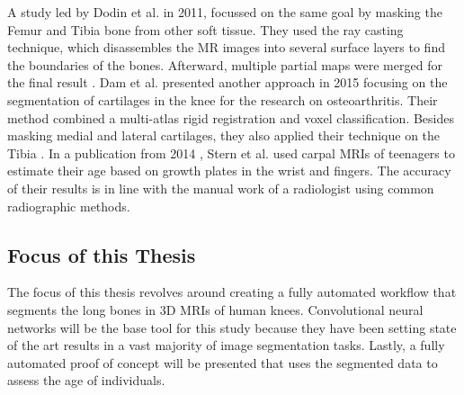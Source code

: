 A study led by Dodin et al. in 2011, focussed on the same goal by masking the Femur and Tibia bone from other soft tissue. They used the ray casting technique, which disassembles the MR images into several surface layers to find the boundaries of the bones. Afterward, multiple partial maps were merged for the final result \cite{Dodin2011}. Dam et al. presented another approach in 2015 focusing on the segmentation of cartilages in the knee for the research on osteoarthritis. Their method combined a multi-atlas rigid registration and voxel classification. Besides masking medial and lateral cartilages, they also applied their technique on the Tibia \cite{Dam}. In a publication from 2014 \cite{Stern2014}, Stern et al. used carpal MRIs of teenagers to estimate their age based on growth plates in the wrist and fingers. The accuracy of their results is in line with the manual work of a radiologist using common radiographic methods.

\subsection{Focus of this Thesis}

The focus of this thesis revolves around creating a fully automated workflow that segments the long bones in 3D MRIs of human knees. Convolutional neural networks will be the base tool for this study because they have been setting state of the art results in a vast majority of image segmentation tasks. Lastly, a fully automated proof of concept will be presented that uses the segmented data to assess the age of individuals.

\newpage
